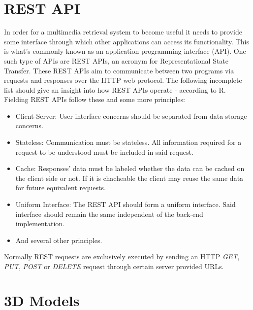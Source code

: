 \section{REST API}
\label{sec:rest_api_concept}

In order for a multimedia retrieval system to become useful it needs to provide some interface through which other applications can access its functionality. This is what's commonly known as an application programming interface (API). One such type of APIs are REST APIs, an acronym for Representational State Transfer. These REST APIs aim to communicate between two programs via requests and responses over the HTTP web protocol. The following incomplete list should give an insight into how REST APIs operate - according to R. Fielding \cite{rest_api:2000} REST APIs follow these and some more principles:
\begin{itemize}
	\item Client-Server: User interface concerns should be separated from data storage concerns.
	\item Stateless: Communication must be stateless. All information required for a request to be understood must be included in said request.
	\item Cache: Responses' data must be labeled whether the data can be cached on the client side or not. If it is chacheable the client may reuse the same data for future equivalent requests.
	\item Uniform Interface: The REST API should form a uniform interface. Said interface should remain the same independent of the back-end implementation.
	\item And several other principles.
\end{itemize}
Normally REST requests are exclusively executed by sending an HTTP \textit{GET}, \textit{PUT}, \textit{POST} or \textit{DELETE} request through certain server provided URLs.\\

\section{3D Models}
\label{sec:3D_models}

